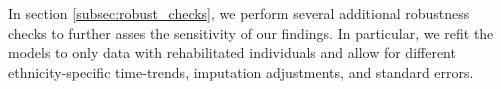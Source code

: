 
In section \ref{subsec:robust_checks}, we perform several additional robustness checks to further asses the sensitivity of our findings. In particular, we refit the models to only data with rehabilitated individuals and allow for different ethnicity-specific time-trends, imputation adjustments, and standard errors.  

 


